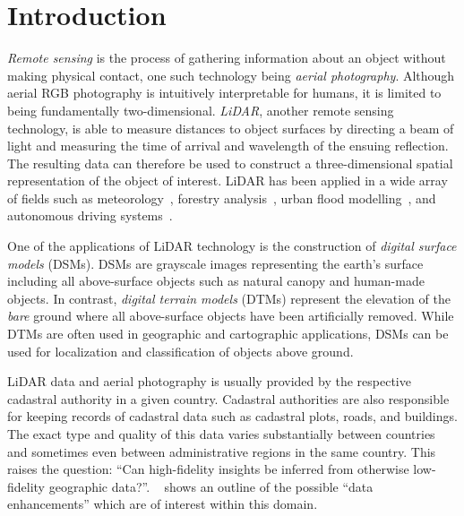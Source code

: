 \section*{Introduction}
\setcounter{page}{1}  %

\textit{Remote sensing} is the process of gathering information about an object without making physical contact, one such technology being \textit{aerial photography}.
Although aerial RGB photography is intuitively interpretable for humans, it is limited to being fundamentally two-dimensional.
\textit{LiDAR}, another remote sensing technology, is able to measure distances to object surfaces by directing a beam of light and measuring the time of arrival and wavelength of the ensuing reflection.
The resulting data can therefore be used to construct a three-dimensional spatial representation of the object of interest.
LiDAR has been applied in a wide array of fields such as meteorology~\cite{lidar_meteorology_1966}, forestry analysis~\cite{lidar_forestry_2000}, urban flood modelling~\cite{lidar_flood_2013}, and autonomous driving systems~\cite{lidar_self_driving_2018}.

One of the applications of LiDAR technology is the construction of \textit{digital surface models} (DSMs).
DSMs are grayscale images representing the earth's surface including all above-surface objects such as natural canopy and human-made objects.
In contrast, \textit{digital terrain models} (DTMs) represent the elevation of the \textit{bare} ground where all above-surface objects have been artificially removed.
While DTMs are often used in geographic and cartographic applications, DSMs can be used for localization and classification of objects above ground.

LiDAR data and aerial photography is usually provided by the respective cadastral authority in a given country.
Cadastral authorities are also responsible for keeping records of cadastral data such as cadastral plots, roads, and buildings.
The exact type and quality of this data varies substantially between countries and sometimes even between administrative regions in the same country.
This raises the question: \enquote{Can high-fidelity insights be inferred from otherwise low-fidelity geographic data?}.
~ shows an outline of the possible \enquote{data enhancements} which are of interest within this domain.

